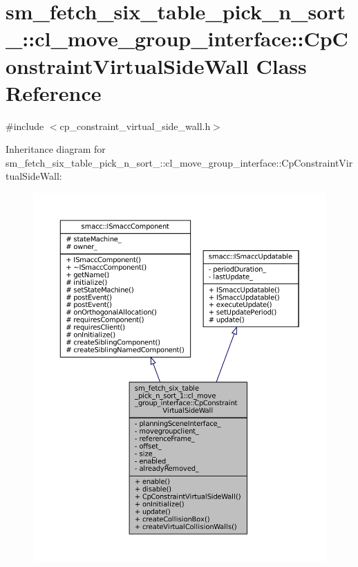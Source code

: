 \hypertarget{classsm__fetch__six__table__pick__n__sort__1_1_1cl__move__group__interface_1_1CpConstraintVirtualSideWall}{}\section{sm\+\_\+fetch\+\_\+six\+\_\+table\+\_\+pick\+\_\+n\+\_\+sort\+\_\+:\+:cl\+\_\+move\+\_\+group\+\_\+interface\+:\+:Cp\+Constraint\+Virtual\+Side\+Wall Class Reference}
\label{classsm__fetch__six__table__pick__n__sort__1_1_1cl__move__group__interface_1_1CpConstraintVirtualSideWall}


{\ttfamily \#include $<$cp\+\_\+constraint\+\_\+virtual\+\_\+side\+\_\+wall.\+h$>$}



Inheritance diagram for sm\+\_\+fetch\+\_\+six\+\_\+table\+\_\+pick\+\_\+n\+\_\+sort\+\_\+:\+:cl\+\_\+move\+\_\+group\+\_\+interface\+:\+:Cp\+Constraint\+Virtual\+Side\+Wall\+:
\nopagebreak
\begin{figure}[H]
\begin{center}
\leavevmode
\includegraphics[width=350pt]{classsm__fetch__six__table__pick__n__sort__1_1_1cl__move__group__interface_1_1CpConstraintVirtualSideWall__inherit__graph}
\end{center}
\end{figure}


